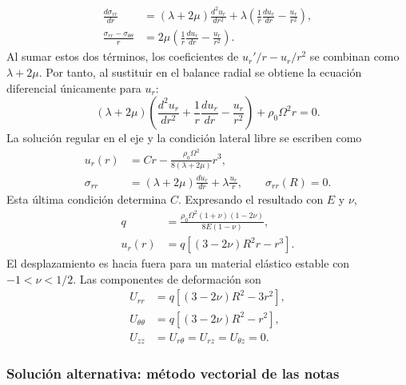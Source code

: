 \documentclass[a4paper]{article}
\begin{document}
\[
\begin{aligned}
\frac{d\sigma_{rr}}{dr}
&=(\lambda+2\mu)\frac{d^2u_r}{dr^2}
+\lambda\left(\frac{1}{r}\frac{du_r}{dr}-\frac{u_r}{r^2}\right),\\
\frac{\sigma_{rr}-\sigma_{\theta\theta}}{r}
&=2\mu\left(\frac{1}{r}\frac{du_r}{dr}-\frac{u_r}{r^2}\right).
\end{aligned}
\]
Al sumar estos dos términos, los coeficientes de $u_r'/r-u_r/r^2$ se combinan como $\lambda+2\mu$. Por tanto, al sustituir en el balance radial se obtiene la ecuación diferencial únicamente para $u_r$:
\[
\boxed{(\lambda+2\mu)\left(\frac{d^2u_r}{dr^2}
+\frac{1}{r}\frac{du_r}{dr}-\frac{u_r}{r^2}\right)
+\rho_0\Omega^2r=0.}
\]
La solución regular en el eje y la condición lateral libre se escriben como
\[
\begin{aligned}
u_r(r)&=Cr-\frac{\rho_0\Omega^2}{8(\lambda+2\mu)}r^3,\\
\sigma_{rr}&=(\lambda+2\mu)\frac{du_r}{dr}+\lambda\frac{u_r}{r},
\qquad \sigma_{rr}(R)=0.
\end{aligned}
\]
Esta última condición determina $C$. Expresando el resultado con $E$ y $\nu$,
\[
\begin{aligned}
q&=\frac{\rho_0\Omega^2(1+\nu)(1-2\nu)}{8E(1-\nu)},\\
u_r(r)&=q\left[(3-2\nu)R^2r-r^3\right].
\end{aligned}
\]
El desplazamiento es hacia fuera para un material elástico estable con $-1<\nu<1/2$. Las componentes de deformación son
\[
\begin{aligned}
U_{rr}&=q\left[(3-2\nu)R^2-3r^2\right],\\
U_{\theta\theta}&=q\left[(3-2\nu)R^2-r^2\right],\\
U_{zz}&=U_{r\theta}=U_{rz}=U_{\theta z}=0.
\end{aligned}
\]


\subsubsection*{Solución alternativa: método vectorial de las notas}
\end{document}
